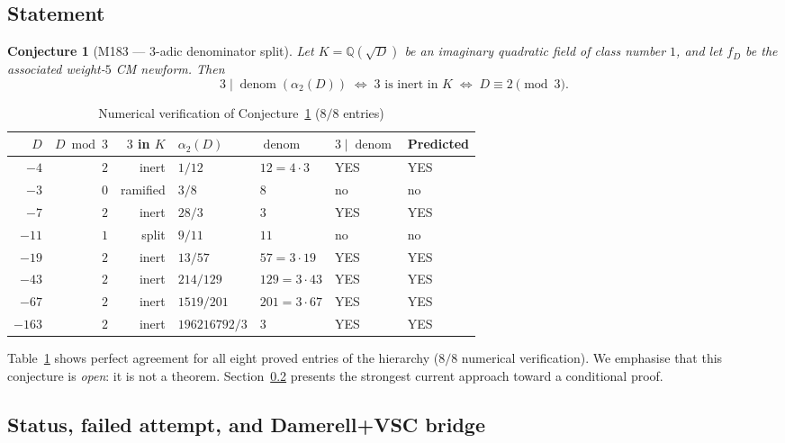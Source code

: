 \documentclass[12pt]{amsart}
\newtheorem{conjecture}[theorem]{Conjecture}
\theoremstyle{definition}
\DeclareMathOperator{\denom}{denom}
\newcommand{\Q}{\mathbb{Q}}
\begin{document}
\subsection{Statement}

\begin{conjecture}[M183 --- $3$-adic denominator split]
  \label{conj:M183}
  Let $K = \Q(\sqrt{D})$ be an imaginary quadratic field of class number $1$,
  and let $f_D$ be the associated weight-$5$ CM newform.
  Then
  \[
    3 \mid \denom(\alpha_2(D)) \;\iff\; \text{$3$ is inert in $K$}
    \;\iff\; D \equiv 2 \pmod{3}.
  \]
\end{conjecture}

\begin{table}[h]
  \caption{Numerical verification of Conjecture~\ref{conj:M183} ($8/8$ entries)}
  \label{tab:M183}
  \renewcommand{\arraystretch}{1.25}
  \begin{tabular}{rrrllll}
    \toprule
    $D$ & $D \bmod 3$ & $3$ in $K$ & $\alpha_2(D)$ & $\denom$ & $3 \mid \denom$ & Predicted \\
    \midrule
    $-4$  & $2$ & inert    & $1/12$         & $12 = 4\cdot 3$  & YES & YES \\
    $-3$  & $0$ & ramified & $3/8$          & $8$              & no  & no  \\
    $-7$  & $2$ & inert    & $28/3$         & $3$              & YES & YES \\
    $-11$ & $1$ & split    & $9/11$         & $11$             & no  & no  \\
    $-19$ & $2$ & inert    & $13/57$        & $57 = 3\cdot 19$ & YES & YES \\
    $-43$ & $2$ & inert    & $214/129$      & $129 = 3\cdot 43$& YES & YES \\
    $-67$ & $2$ & inert    & $1519/201$     & $201 = 3\cdot 67$& YES & YES \\
    $-163$& $2$ & inert    & $196216792/3$  & $3$              & YES & YES \\
    \bottomrule
  \end{tabular}
\end{table}

Table~\ref{tab:M183} shows perfect agreement for all eight proved entries
of the hierarchy ($8/8$ numerical verification).
We emphasise that this conjecture is \emph{open}: it is not a theorem.
Section~\ref{ssec:M183-proof-path} presents the strongest current approach
toward a conditional proof.

\subsection{Status, failed attempt, and Damerell+VSC bridge}
\label{ssec:M183-proof-path}
\end{document}
